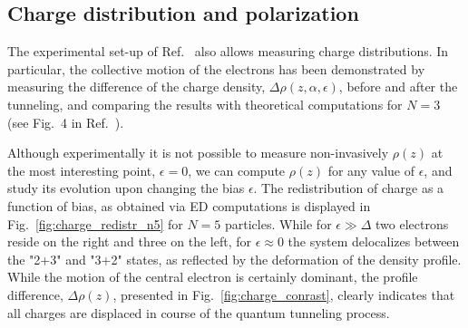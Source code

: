 \documentclass[aps, prb, floatfix, twocolumn, notitlepage, superscriptaddress, 10pt]{revtex4-2}
\newcommand{\1}{{1\hspace*{-0.5ex} \textrm{l} \hspace*{0.5ex}}}
\begin{document}
\subsection{Charge distribution and polarization}

The experimental set-up of Ref.~\cite{Shapir.2019} also allows measuring charge distributions. 
In particular, the collective motion of the electrons has been demonstrated 
by  measuring the difference of the charge density, $\Delta \rho(z,\alpha, \epsilon)$, 
before and after the tunneling,  and comparing the results with theoretical computations for $N=3$ (see Fig.~4 in 
Ref.~\cite{Shapir.2019}). 





Although experimentally it is not possible to measure non-invasively $ \rho(z)$ at the most interesting point, 
$\epsilon = 0$, we can compute $ \rho(z)$  for any value of $\epsilon$, and study its evolution 
upon changing the bias $\epsilon$. The redistribution of charge as a function of bias, as obtained 
via ED computations is displayed in Fig.~\ref{fig:charge_redistr_n5}  for $N=5$ particles. 
While for $\epsilon \gg \Delta$ two electrons reside on the right and three on the left, 
for $\epsilon\approx 0$ the system delocalizes 
between the "2+3" and "3+2" states, as reflected by the deformation of the density profile. 
While the motion of the central electron is certainly dominant, 
the profile difference, $\Delta \rho(z)$, presented in Fig.~\ref{fig:charge_conrast},
clearly indicates that all charges are displaced in course of the quantum tunneling process.
 
\end{document}
